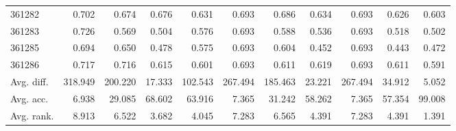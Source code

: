 \begin{tabular}{lrrrrrrrrrr}
361282 & 0.702 & 0.674 & 0.676 & 0.631 & 0.693 & 0.686 & 0.634 & 0.693 & 0.626 & 0.603 \\
361283 & 0.726 & 0.569 & 0.504 & 0.576 & 0.693 & 0.588 & 0.536 & 0.693 & 0.518 & 0.502 \\
361285 & 0.694 & 0.650 & 0.478 & 0.575 & 0.693 & 0.604 & 0.452 & 0.693 & 0.443 & 0.472 \\
361286 & 0.717 & 0.716 & 0.615 & 0.601 & 0.693 & 0.611 & 0.619 & 0.693 & 0.611 & 0.591 \\
Avg. diff. & 318.949 & 200.220 & 17.333 & 102.543 & 267.494 & 185.463 & 23.221 & 267.494 & 34.912 & 5.052 \\
Avg. acc. & 6.938 & 29.085 & 68.602 & 63.916 & 7.365 & 31.242 & 58.262 & 7.365 & 57.354 & 99.008 \\
Avg. rank. & 8.913 & 6.522 & 3.682 & 4.045 & 7.283 & 6.565 & 4.391 & 7.283 & 4.391 & 1.391 \\
\bottomrule
\end{tabular}
